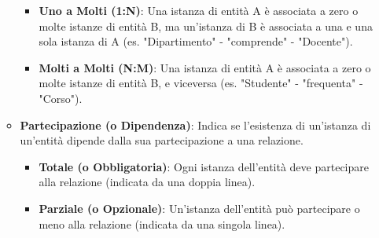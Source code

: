 \begin{itemize}
\begin{itemize}
\begin{itemize}
            \item \textbf{Uno a Molti (1:N)}: Una istanza di entità A è associata a zero o molte istanze di entità B, ma un'istanza di B è associata a una e una sola istanza di A (es. "Dipartimento" - "comprende" - "Docente").
            \item \textbf{Molti a Molti (N:M)}: Una istanza di entità A è associata a zero o molte istanze di entità B, e viceversa (es. "Studente" - "frequenta" - "Corso").
        \end{itemize}
        \item \textbf{Partecipazione (o Dipendenza)}: Indica se l'esistenza di un'istanza di un'entità dipende dalla sua partecipazione a una relazione.
        \begin{itemize}
            \item \textbf{Totale (o Obbligatoria)}: Ogni istanza dell'entità deve partecipare alla relazione (indicata da una doppia linea).
            \item \textbf{Parziale (o Opzionale)}: Un'istanza dell'entità può partecipare o meno alla relazione (indicata da una singola linea).
        \end{itemize}
    \end{itemize}
\end{itemize}

